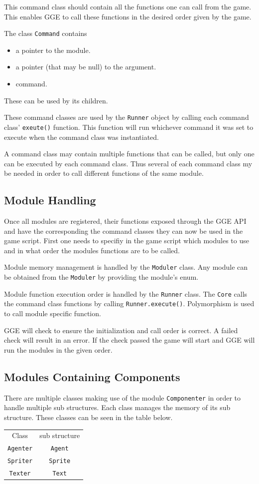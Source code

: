 This command class should contain all the functions one can call from the game. 
This enables GGE to call these functions in the desired order given by the game.

The class \verb|Command| contains
\begin{itemize}
	\item a pointer to the module.
	\item a pointer (that may be null) to the argument.
	\item command.
\end{itemize}
These can be used by its children.

These command classes are used by the \verb|Runner| object by calling each command class' \verb|exeute()| function.
This function will run whichever command it was set to execute when the command class was instantiated.

A command class may contain multiple functions that can be called, but only one can be executed by each command class.
Thus several of each command class my be needed in order to call different functions of the same module.



\subsection{Module Handling}
Once all modules are registered, their functions exposed through the GGE API and have the corresponding 
the command classes they can now be used in the game script. First one needs to specifiy in the game script which modules
to use and in what order the modules functions are to be called. 

Module memory management is handled by the \verb|Moduler| class. Any module can be obtained from the \verb|Moduler| by providing the module's enum.

Module function execution order is handled by the \verb|Runner| class. The \verb|Core| calls the command class functions by calling \verb|Runner.execute()|. Polymorphism is used to call module specific function.

GGE will check to ensure the initialization and call order is correct. 
A failed check will result in an error. 
If the check passed the game will start and GGE will run the modules in the given order.

\subsection{Modules Containing Components}
There are multiple classes making use of the module \verb|Componenter| in order to handle multiple sub structures.
Each class manages the memory of its sub structure. 
These classes can be seen in the table below.
\begin{tabular}{|c|c|}
	Class & sub structure\\
	\verb|Agenter| & \verb|Agent| \\
	\verb|Spriter| & \verb|Sprite| \\
	\verb|Texter| & \verb|Text| \\
\end{tabular}

